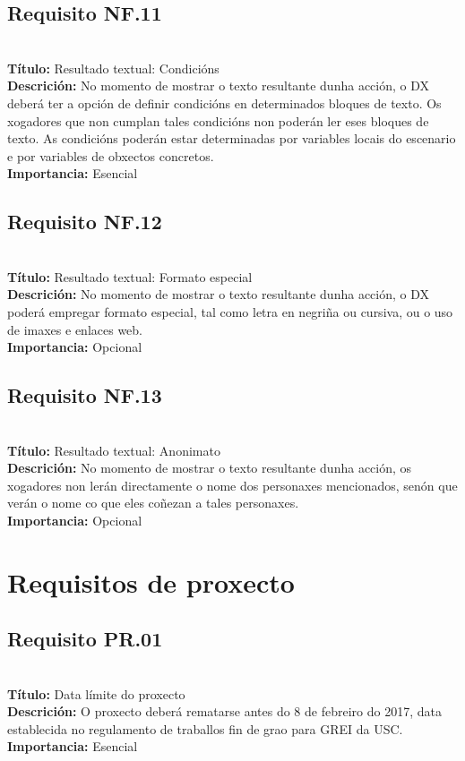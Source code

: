 \subsection{Requisito NF.11}~\\
{\bf Título:} Resultado textual: Condicións\\
{\bf Descrición:} No momento de mostrar o texto resultante dunha acción, o DX
deberá ter a opción de definir condicións en determinados bloques de texto. Os
xogadores que non cumplan tales condicións non poderán ler eses bloques de
texto. As condicións poderán estar determinadas por variables locais do
escenario e por variables de obxectos concretos.\\
{\bf Importancia:} Esencial

\subsection{Requisito NF.12}~\\
{\bf Título:} Resultado textual: Formato especial\\
{\bf Descrición:} No momento de mostrar o texto resultante dunha acción, o DX
poderá empregar formato especial, tal como letra en negriña ou cursiva, ou o
uso de imaxes e enlaces web.\\
{\bf Importancia:} Opcional

\subsection{Requisito NF.13}~\\
{\bf Título:} Resultado textual: Anonimato\\
{\bf Descrición:} No momento de mostrar o texto resultante dunha acción, os
xogadores non lerán directamente o nome dos personaxes mencionados, senón que
verán o nome co que eles coñezan a tales personaxes.\\
{\bf Importancia:} Opcional



\section{Requisitos de proxecto}
\subsection{Requisito PR.01}~\\
{\bf Título:} Data límite do proxecto\\
{\bf Descrición:} O proxecto deberá rematarse antes do 8 de febreiro do 2017,
data establecida no regulamento de traballos fin de grao para GREI da USC.\\
{\bf Importancia:} Esencial


